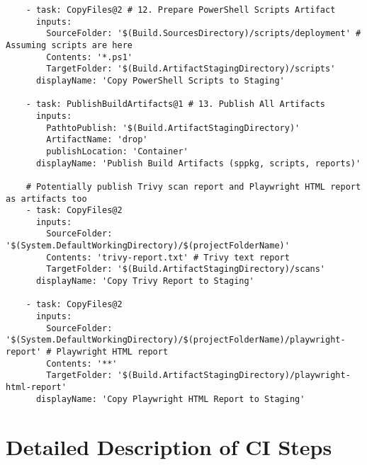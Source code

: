 \begin{verbatim}
    - task: CopyFiles@2 # 12. Prepare PowerShell Scripts Artifact
      inputs:
        SourceFolder: '$(Build.SourcesDirectory)/scripts/deployment' # Assuming scripts are here
        Contents: '*.ps1'
        TargetFolder: '$(Build.ArtifactStagingDirectory)/scripts'
      displayName: 'Copy PowerShell Scripts to Staging'

    - task: PublishBuildArtifacts@1 # 13. Publish All Artifacts
      inputs:
        PathtoPublish: '$(Build.ArtifactStagingDirectory)'
        ArtifactName: 'drop'
        publishLocation: 'Container'
      displayName: 'Publish Build Artifacts (sppkg, scripts, reports)'

    # Potentially publish Trivy scan report and Playwright HTML report as artifacts too
    - task: CopyFiles@2
      inputs:
        SourceFolder: '$(System.DefaultWorkingDirectory)/$(projectFolderName)'
        Contents: 'trivy-report.txt' # Trivy text report
        TargetFolder: '$(Build.ArtifactStagingDirectory)/scans'
      displayName: 'Copy Trivy Report to Staging'

    - task: CopyFiles@2
      inputs:
        SourceFolder: '$(System.DefaultWorkingDirectory)/$(projectFolderName)/playwright-report' # Playwright HTML report
        Contents: '**'
        TargetFolder: '$(Build.ArtifactStagingDirectory)/playwright-html-report'
      displayName: 'Copy Playwright HTML Report to Staging'
\end{verbatim}

\section{Detailed Description of CI Steps}
\label{sec:CIDetailedSteps}

